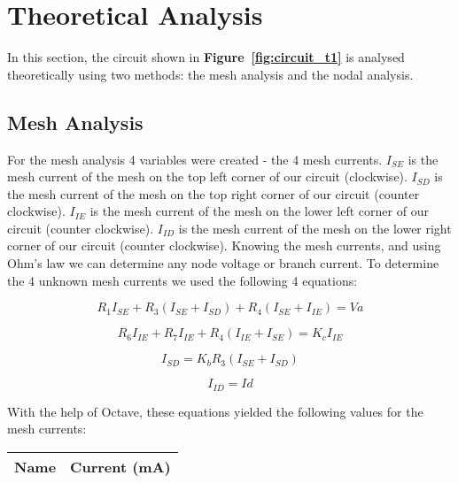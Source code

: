 \section{Theoretical Analysis}
\label{sec:analysis}

In this section, the circuit shown in \textbf{Figure~\ref{fig:circuit_t1}} is analysed
theoretically using two methods: the mesh analysis and the nodal analysis.\par

\subsection{Mesh Analysis} 
For the mesh analysis 4 variables were created - the 4 mesh currents. {\it$I_{SE}$ } is the mesh current of the mesh on the top left corner of our circuit (clockwise). {\it$I_{SD}$} is the mesh current of the mesh on the top right corner of our circuit (counter clockwise). {\it$I_{IE}$ } is the mesh current of the mesh on the lower left corner of our circuit (counter clockwise). {\it$I_{ID}$} is the mesh current of the mesh on the lower right corner of our circuit (counter clockwise). Knowing the mesh currents, and using Ohm's law we can determine any node voltage or branch current. To determine the 4 unknown mesh currents we used the following 4 equations:


\begin {equation}
	R_1I_{SE} + R_3(I_{SE}+I_{SD}) + R_4(I_{SE}+I_{IE}) = Va
	\label{eq:m1}
\end{equation}

\begin {equation}
	R_6I_{IE} + R_7I_{IE} + R_4(I_{IE}+I_{SE}) = K_cI_{IE}
	\label{eq:m2}
\end{equation}

\begin {equation}
	I_{SD} = K_bR_3(I_{SE}+I_{SD})
	\label{eq:m3}
\end{equation}

\begin {equation}
	I_{ID} = Id
	\label{eq:m4}
\end{equation}

With the help of Octave, these equations yielded the following values for the mesh currents:\par

\begin{table}[h]
  \centering
  \begin{tabular}{|l|r|}
    \hline    
    {\bf Name} & {\bf Current (mA)}\\ \hline
    
  \end{tabular}
  \label{tab:theoretical_curr}
\end{table}

